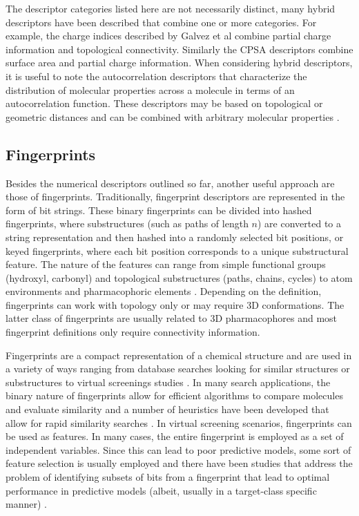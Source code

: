 \documentclass[letterpaper, 12pt]{article}
\begin{document}
The descriptor categories listed here are not necessarily distinct,
many hybrid descriptors have been described that combine one or more
categories. For example, the charge indices described by Galvez et al
\cite{Galvez:1994aa} combine partial charge information and
topological connectivity. Similarly the CPSA descriptors combine
surface area and partial charge information. When considering hybrid
descriptors, it is useful to note the autocorrelation descriptors that
characterize the distribution of molecular properties across a
molecule in terms of an autocorrelation function. These descriptors
may be based on topological or geometric distances and can be combined
with arbitrary molecular properties \cite{Moreau:1980aa,Broto:1984aa}.

\subsection{Fingerprints}

Besides the numerical descriptors outlined so far, another useful
approach are those of fingerprints. Traditionally, fingerprint descriptors are
represented in the form of bit strings. These binary fingerprints can be
divided into hashed fingerprints, where substructures (such as paths
of length $n$) are converted to a string representation and then
hashed into a randomly selected bit positions, or keyed fingerprints,
where each bit position corresponds to a unique substructural
feature. The nature of the features can range from simple functional
groups (hydroxyl, carbonyl) and topological substructures (paths,
chains, cycles) to atom environments \cite{Bremser1978,Bender:2004aa}
and pharmacophoric elements \cite{Renner:2006aa}. Depending on the
definition, fingerprints can work with topology only or may require 3D
conformations. The latter class of fingerprints are usually related to
3D pharmacophores and most fingerprint definitions only require
connectivity information. 

Fingerprints are a compact representation of a chemical structure and
are used in a variety of ways ranging from database searches looking
for similar structures or substructures to virtual screenings studies
\cite{Sun:2006kx}. In many search applications, the binary nature of
fingerprints allow for efficient algorithms to compare molecules and
evaluate similarity and a number of heuristics have been developed
that allow for rapid similarity searches
\cite{Baldi:2008aa,Swamidass:2007ab}. In virtual screening scenarios,
fingerprints can be used as features. In many cases, the entire
fingerprint is employed as a set of independent variables. Since this
can lead to poor predictive models, some sort of feature selection is
usually employed and there have been studies that address the problem
of identifying subsets of bits from a fingerprint that lead to optimal
performance in predictive models (albeit, usually in a target-class
specific manner) \cite{Xue:2004fk}.
\end{document}
